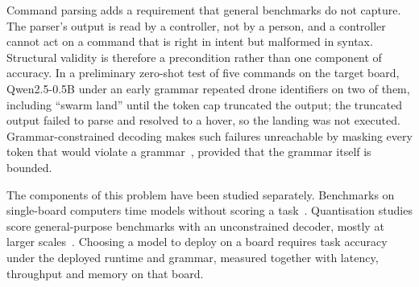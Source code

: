 \documentclass[a4paper,fleqn]{cas-dc}
\begin{document}
Command parsing adds a requirement that general benchmarks do not capture. The parser's output is
read by a controller, not by a person, and a controller cannot act on a command that is right in
intent but malformed in syntax. Structural validity is therefore a precondition rather than one
component of accuracy. In a preliminary zero-shot test of five commands on the target board, Qwen2.5-0.5B under an
early grammar repeated drone identifiers on two of them, including ``swarm land'' until the token cap
truncated the output; the truncated output failed to parse and resolved to a hover, so the landing was not executed.
Grammar-constrained decoding makes such failures unreachable by masking every token that would
violate a grammar~\citep{willard2023,koo2024}, provided that the grammar itself is bounded.

The components of this problem have been studied separately. Benchmarks on single-board computers
time models without scoring a task~\citep{sbc2025}. Quantisation studies score general-purpose
benchmarks with an unconstrained decoder, mostly at larger scales~\citep{kurtic2025,kurt2026,slmquant}.
 Choosing a model to deploy on a board requires task accuracy
under the deployed runtime and grammar, measured together with latency, throughput and memory on
that board.
\end{document}
